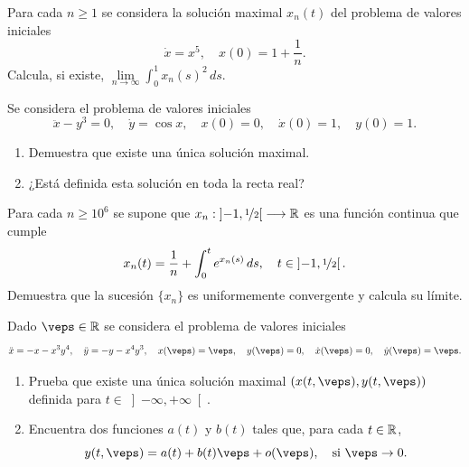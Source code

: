 \documentclass[12pt]{article}
\begin{document}
    \begin{ejercicio}
        Para cada $n \geq 1$ se considera la solución maximal $x_n(t)$ del problema de valores iniciales
        \[
            \dot{x} = x^5, \quad x(0) = 1 + \frac{1}{n}.
        \]
        Calcula, si existe, $\lim\limits_{n \to \infty} \int_{0}^{1} x_n(s)^2 \, ds$.
    \end{ejercicio}

    \begin{ejercicio}
        Se considera el problema de valores iniciales
        \[
            \ddot{x} - y^3 = 0, \quad \dot{y} = \cos x, \quad x(0) = 0, \quad \dot{x}(0) = 1, \quad y(0) = 1.
        \]
        \begin{enumerate}[label=\alph*)]
            \item Demuestra que existe una única solución maximal.
            \item ¿Está definida esta solución en toda la recta real?
        \end{enumerate}
    \end{ejercicio}

    \begin{ejercicio}
        Para cada $n \geq 10^6$ se supone que $x_n : \left]-1, \nicefrac{1}{2}\right[ \longrightarrow \mathbb{R}$ es una función continua que cumple
        \[
            x_n(t) = \frac{1}{n} + \int_{0}^{t} e^{x_n(s)} \, ds, \quad t \in \left]-1, \nicefrac{1}{2}\right[.
        \]
        Demuestra que la sucesión $\{x_n\}$ es uniformemente convergente y calcula su límite.
    \end{ejercicio}

    \begin{ejercicio}
        Dado $\veps \in \bb{R}$ se considera el problema de valores iniciales
        \[
            \ddot{x} = -x - x^3 y^4, \quad \ddot{y} = -y - x^4 y^3, \quad x(\veps) = \veps, \quad y(\veps) = 0, \quad \dot{x}(\veps) = 0, \quad \dot{y}(\veps) = \veps.
        \]
        \begin{enumerate}[label=\alph*)]
            \item Prueba que existe una única solución maximal $(x(t, \veps), y(t, \veps))$ definida para $t \in \left]-\infty, +\infty\right[$.
            \item Encuentra dos funciones $a(t)$ y $b(t)$ tales que, para cada $t \in \mathbb{R}$,
            \[
                y(t, \veps) = a(t) + b(t)\veps + o(\veps), \quad \text{si } \veps \to 0.
            \]
        \end{enumerate}
    \end{ejercicio}

    \newpage
\end{document}

